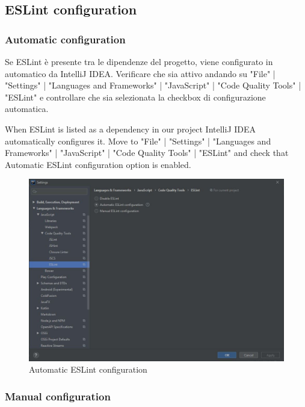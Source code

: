 	\subsection{ESLint configuration}
		\subsubsection{Automatic configuration}
	Se ESLint è presente tra le dipendenze del progetto, viene configurato in automatico da IntelliJ IDEA. Verificare che sia attivo andando su "File" | "Settings" | "Languages and Frameworks" | "JavaScript" | "Code Quality Tools" | "ESLint" e controllare che sia selezionata la checkbox di configurazione automatica. 
	
When ESLint is listed as a dependency in our project IntelliJ IDEA automatically configures it. Move to "File" | "Settings" | "Languages and Frameworks" | "JavaScript" | "Code Quality Tools" | "ESLint" and check that Automatic ESLint configuration option is enabled. 


\begin{figure}[H]
		\centering
		\includegraphics[scale=0.60]{../Developer_manual/img/automatic_eslint_configuration.jpg}
		\caption{Automatic ESLint configuration}
	\end{figure}	

		\subsubsection{Manual configuration}
	
